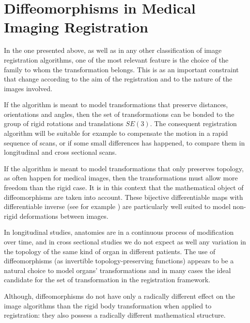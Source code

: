 \section{Diffeomorphisms in Medical Imaging Registration}

In the one presented above, as well as in any other classification of image registration algorithms, one of the most relevant feature is the choice of the family to whom the transformation belongs. This is as an important constraint that change according to the aim of the registration and to the nature of the images involved. 

If the algorithm is meant to model transformations that preserve distances, orientations and angles, then the set of transformations can be bonded to the group of rigid rotations and translations $SE(3)$. The consequent registration algorithm will be suitable for example to compensate the motion in a rapid sequence of scans, or if some small differences has happened, to compare them in longitudinal and cross sectional scans.

If the algorithm is meant to model transformations that only preserves topology, as often happen for medical images, then the transformations must allow more freedom than the rigid case. It is in this context that the mathematical object of diffeomorphisms are taken into account. These bijective differentiable maps with differentiable inverse (see for example \cite{lee2012introduction}) are particularly well suited to model non-rigid deformations between images.

In longitudinal studies, anatomies are in a continuous process of modification over time, and in cross sectional studies we do not expect as well any variation in the topology of the same kind of organ in different patients. The use of diffeomorphisms (as invertible topology-preserving functions) appears to be a natural choice to model organs' transformations and in many cases the ideal candidate for the set of transformation in the registration framework.

Although, diffeomorphisms do not have only a radically different effect on the image algorithms than the rigid body transformation when applied to registration: they also possess a radically different mathematical structure.

